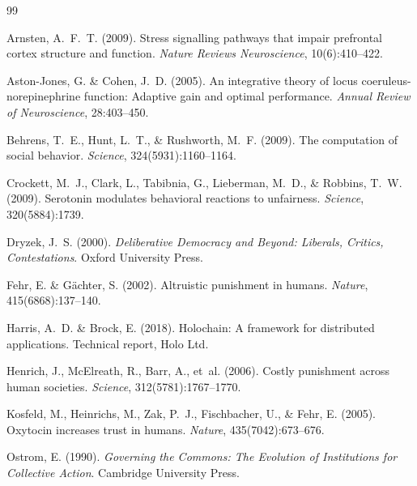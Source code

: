\documentclass[11pt,a4paper]{article}
\begin{document}
\begin{thebibliography}{99}

Arnsten, A.~F.~T. (2009).
\newblock Stress signalling pathways that impair prefrontal cortex structure and function.
\newblock \emph{Nature Reviews Neuroscience}, 10(6):410--422.

Aston-Jones, G. \& Cohen, J.~D. (2005).
\newblock An integrative theory of locus coeruleus-norepinephrine function: Adaptive gain and optimal performance.
\newblock \emph{Annual Review of Neuroscience}, 28:403--450.

Behrens, T.~E., Hunt, L.~T., \& Rushworth, M.~F. (2009).
\newblock The computation of social behavior.
\newblock \emph{Science}, 324(5931):1160--1164.

Crockett, M.~J., Clark, L., Tabibnia, G., Lieberman, M.~D., \& Robbins, T.~W. (2009).
\newblock Serotonin modulates behavioral reactions to unfairness.
\newblock \emph{Science}, 320(5884):1739.

Dryzek, J.~S. (2000).
\newblock \emph{Deliberative Democracy and Beyond: Liberals, Critics, Contestations}.
\newblock Oxford University Press.

Fehr, E. \& G{\"a}chter, S. (2002).
\newblock Altruistic punishment in humans.
\newblock \emph{Nature}, 415(6868):137--140.

Harris, A.~D. \& Brock, E. (2018).
\newblock Holochain: A framework for distributed applications.
\newblock Technical report, Holo Ltd.

Henrich, J., McElreath, R., Barr, A., et~al. (2006).
\newblock Costly punishment across human societies.
\newblock \emph{Science}, 312(5781):1767--1770.

Kosfeld, M., Heinrichs, M., Zak, P.~J., Fischbacher, U., \& Fehr, E. (2005).
\newblock Oxytocin increases trust in humans.
\newblock \emph{Nature}, 435(7042):673--676.

Ostrom, E. (1990).
\newblock \emph{Governing the Commons: The Evolution of Institutions for Collective Action}.
\newblock Cambridge University Press.


\end{thebibliography}
\end{document}
